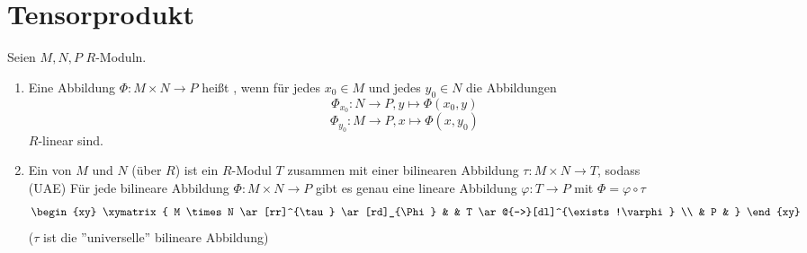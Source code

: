 \section{Tensorprodukt}

\begin{Def}
  Seien $M, N, P$ $R$-Moduln.

  \begin{enumerate}
    \item Eine Abbildung $\Phi: M \times N \to P$ heißt
          , wenn für jedes $x_0 \in M$ und
          jedes $y_0 \in N$ die Abbildungen 
          \[\Phi_{x_0}: N \to P, y \mapsto \Phi(x_0,y)\]
          \[\Phi_{y_0}: M \to P, x \mapsto \Phi(x,y_0)\] $R$-linear sind.
    \item Ein  von $M$ und $N$ (über $R$)
          ist ein $R$-Modul $T$ zusammen mit einer bilinearen Abbildung $\tau: M
          \times N \to T$, sodass\\
          (UAE) Für jede bilineare Abbildung $\Phi: M \times N \to P$ gibt es
          genau eine lineare Abbildung $\varphi: T \to P$ mit $\Phi = \varphi \circ
          \tau$
          \[
            \begin{xy}
              \xymatrix{
                M \times N \ar[rr]^{\tau} \ar[rd]_{\Phi}  &     &  T \ar@{-->}[dl]^{\exists!\varphi}  \\
                                                          &  P  &
              }
            \end{xy}
          \]
          ($\tau$ ist die ''universelle'' bilineare Abbildung)
  \end{enumerate}
\end{Def}

